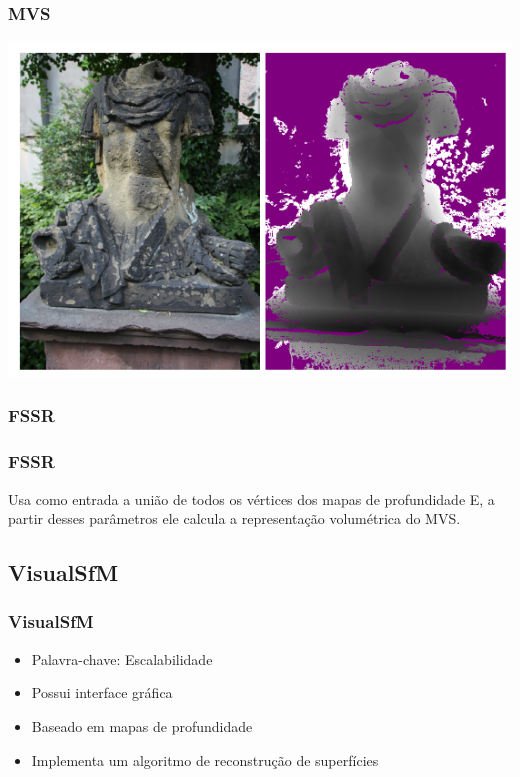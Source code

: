 \documentclass[table, usenames, svgnames, xcolor=dvipsnames]{beamer}
\begin{document}
\begin{frame}
\frametitle{\textbf{MVS}}
	\begin{center}
	 	\includegraphics[width=0.8\linewidth]{figs/mvedepth.png}
	\end{center}
\end{frame}

\subsubsection{FSSR}

\begin{frame}
\frametitle{\textbf{FSSR}}
	\begin{center}
	Usa como entrada a união de todos os vértices dos mapas de profundidade
	E, a partir desses parâmetros ele calcula a representação volumétrica do MVS.
	\end{center}
\end{frame}


\subsection{VisualSfM}

\begin{frame} 
\frametitle{\textbf{VisualSfM}}
	\begin{center}
		\begin{itemize}
			\item {Palavra-chave: Escalabilidade}
			\item {Possui interface gráfica}
			\item {Baseado em mapas de profundidade}
			\item {Implementa um algoritmo de reconstrução de superfícies}
		\end{itemize}
	\end{center}
\end{frame}
\end{document}
